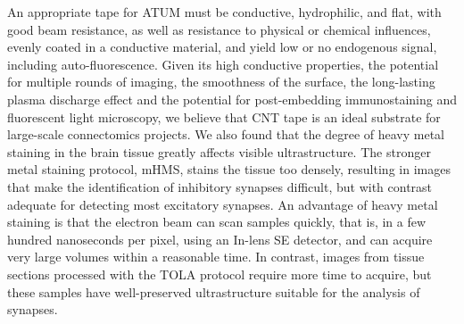 \documentclass{article}
\begin{document}
An appropriate tape for ATUM must be conductive, hydrophilic, and flat, with good beam resistance, as well as resistance to physical or chemical influences, evenly coated in a conductive material, and yield low or no endogenous signal, including auto-fluorescence. Given its high conductive properties, the potential for multiple rounds of imaging, the smoothness of the surface, the long-lasting plasma discharge effect and the potential for post-embedding immunostaining and fluorescent light microscopy, we believe that CNT tape is an ideal substrate for large-scale connectomics projects. We also found that the degree of heavy metal 
staining in the brain tissue greatly affects visible ultrastructure. The stronger metal staining protocol, mHMS, stains the tissue too densely, resulting in images that make the identification of inhibitory synapses difficult, but with contrast adequate for detecting most excitatory synapses. An advantage of heavy metal staining is that the electron beam can scan samples quickly, that is, in a few hundred nanoseconds per pixel, using an In-lens SE detector, and can acquire very large volumes within a reasonable time. In contrast, images from tissue sections processed with the TOLA protocol require more time to acquire, but these samples have well-preserved ultrastructure suitable for the analysis of synapses.
\end{document}
